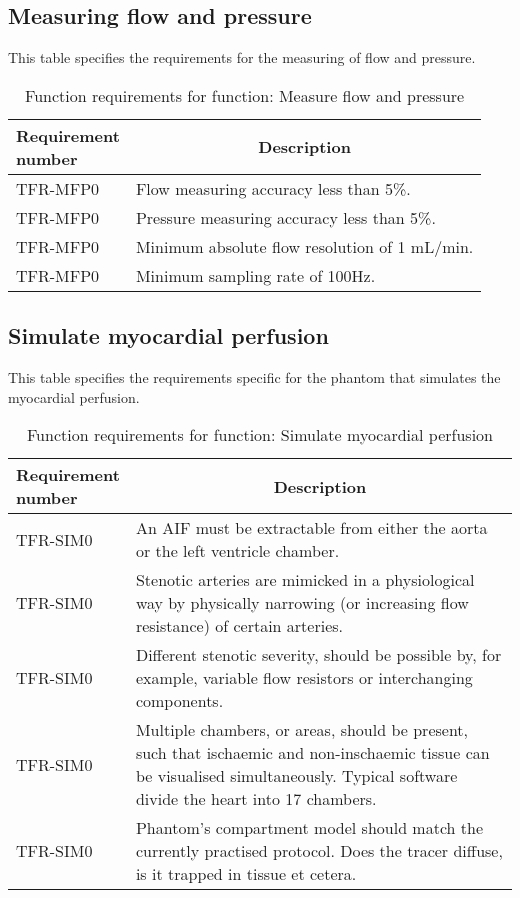 \subsection{Measuring flow and pressure}
\begin{table} [H]
\caption{Function requirements for function: Measure flow and pressure}
\label{tab:funcmeas}
This table specifies the requirements for the measuring of flow and pressure.
\begin{tabular}{l|p{120mm}|}
	\makecell[l]{\textbf{Requirement} \\  \textbf{number}} & \multicolumn{1}{c}{\textbf{Description}}\\
	\hline
	TFR-MFP0 & Flow measuring accuracy less than 5\%. \\
	TFR-MFP0 & Pressure measuring accuracy less than 5\%. \\
	TFR-MFP0 & Minimum absolute flow resolution of 1 mL/min. \\
	TFR-MFP0 & Minimum sampling rate of 100Hz. \\
	\cline{2-2}
\end{tabular}
\raggedright
\end{table}

\subsection{Simulate myocardial perfusion}
\begin{table} [H]
\caption{Function requirements for function: Simulate myocardial perfusion}
\label{tab:funcsim}
This table specifies the requirements specific for the phantom that simulates the myocardial perfusion.
\begin{tabular}{l|p{120mm}|}
	\makecell[l]{\textbf{Requirement} \\  \textbf{number}} & \multicolumn{1}{c}{\textbf{Description}}\\
	\hline
	TFR-SIM0 & An \ac{AIF} must be extractable from either the aorta or the left ventricle chamber.\\
	TFR-SIM0 & Stenotic arteries are mimicked in a physiological way by physically narrowing (or increasing flow resistance) of certain arteries. \\
	TFR-SIM0 & Different stenotic severity, should be possible by, for example, variable flow resistors or interchanging components. \\
	TFR-SIM0 & Multiple chambers, or areas, should be present, such that ischaemic and non-inschaemic tissue can be visualised simultaneously. Typical software divide the heart into 17 chambers.\\
	TFR-SIM0 & Phantom's compartment model should match the currently practised protocol. Does the tracer diffuse, is it trapped in tissue et cetera. \\
	\cline{2-2}
\end{tabular}
\raggedright
\end{table}

